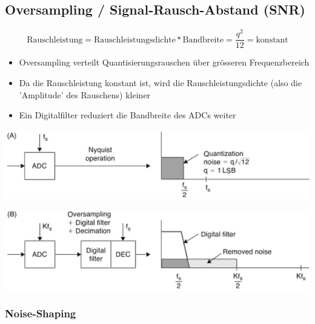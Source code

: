 

\subsection{Oversampling / Signal-Rausch-Abstand (SNR)}

$$ \boxed{ \text{Rauschleistung} = \text{Rauschleistungsdichte} * \text{Bandbreite} = \frac{q^2}{12} = \text{konstant}} $$

\begin{itemize}
    \item Oversampling verteilt Quantisierungsrauschen über grösseren Frequenzbereich
    \item Da die Rauschleistung konstant ist, wird die Rauschleistungsdichte (also die 'Amplitude' des Rauschens) kleiner
    \item Ein Digitalfilter reduziert die Bandbreite des ADCs weiter
\end{itemize}

\begin{minipage}[c]{0.48\columnwidth}
    \includegraphics[width=\columnwidth]{images/rauschen_ohne_oversampling.png}
\end{minipage}
\hfill
\begin{minipage}[c]{0.48\columnwidth}
    \includegraphics[width=\columnwidth]{images/rauschen_mit_oversampling.png}
\end{minipage}


\subsubsection{Noise-Shaping}

